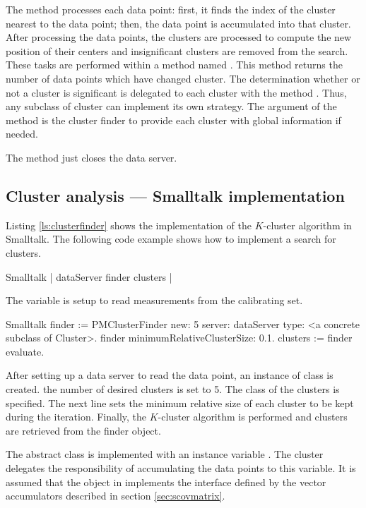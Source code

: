 \noindent The method  processes each data
point: first, it finds the index of the cluster nearest to the
data point; then, the data point is accumulated into that cluster.
After processing the data points, the clusters are processed to
compute the new position of their centers and insignificant
clusters are removed from the search. These tasks are performed
within a method named . This
method returns the number of data points which have changed
cluster. The determination whether or not a cluster is significant
is delegated to each cluster with the method .
Thus, any subclass of cluster can implement its own strategy. 
The argument of the method  is the cluster finder to provide each cluster with global information
if needed.

\noindent The method  just closes the data
server.

\subsection{Cluster analysis --- Smalltalk implementation}
Listing \ref{ls:clusterfinder} shows the implementation of the
$K$-cluster algorithm in Smalltalk. The following code example
shows how to implement a search for clusters.

\begin{listing}{Smalltalk}
{ }
 | dataServer finder clusters |
\end{listing}

The variable  is setup to read measurements from the calibrating set.

\begin{listing}{Smalltalk}
{ }
 finder := PMClusterFinder new: 5 server: dataServer type: <a concrete subclass of Cluster>.
 finder minimumRelativeClusterSize: 0.1.
 clusters := finder evaluate.
\end{listing}

After setting up a data server to read the data point, an instance
of class  is created. the number of desired
clusters is set to 5. The class of the clusters is specified. The
next line sets the minimum relative size of each cluster to be
kept during the iteration. Finally, the $K$-cluster algorithm is
performed and clusters are retrieved from the finder object.

The abstract class  is implemented with an
instance variable . The cluster delegates the
responsibility of accumulating the data points to this variable.
It is assumed that the object in  implements the
interface defined by the vector accumulators described in section
\ref{sec:scovmatrix}.


